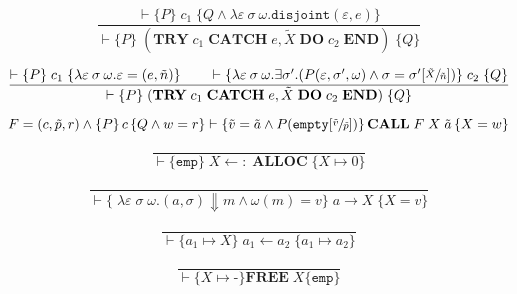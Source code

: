\begin{equation}\label{eqn:hoare-try}
\frac{\vdash \{P\} \; c_1 \; \{Q \wedge \lambda \varepsilon\:\sigma\:\omega. \texttt{disjoint}(\varepsilon, e)\}}{\vdash \{P\} \; (\textbf{TRY}\; c_1\; \textbf{CATCH}\; e, \tilde{X}\; \textbf{DO}\; c_2\; \textbf{END}) \; \{Q\}}
\end{equation}

\begin{equation}\label{eqn:hoare-catch}
\frac{\vdash \{P\} \; c_1 \; \{\lambda \varepsilon\:\sigma\:\omega. \varepsilon = (e, \tilde{n})\} \qquad \vdash \{\lambda \varepsilon\:\sigma\:\omega. \exists \sigma'. (P(\varepsilon, \sigma', \omega) \wedge \sigma = \sigma'[\sfrac{\tilde{X}}{\tilde{n}}])\} \; c_2 \; \{Q\}}{\vdash \{P\} \; (\textbf{TRY}\; c_1\; \textbf{CATCH}\; e, \tilde{X}\; \textbf{DO}\; c_2\; \textbf{END}) \; \{Q\}}
\end{equation}

\begin{equation}\label{eqn:hoare-call}
F = (c,\tilde{p},r) \wedge \left\{P\right\} c \left\{Q \wedge w = r\right\} \vdash \left\{\tilde{v} = \tilde{a} \wedge P(\texttt{empty}[\sfrac{\tilde{v}}{\tilde{p}}])\right\}\textbf{CALL} \; F \; X \; \tilde{a} \left\{X = w\right\}
\end{equation}

\begin{equation}\label{eqn:hoare-alloc}
\frac{}{\vdash \{ \texttt{emp} \}\; X\leftarrow:\;\textbf{ALLOC}\; \{X \mapsto 0\}}
\end{equation}

\begin{equation}\label{eqn:hoare-read}
\frac{}{\vdash \{\; \lambda\varepsilon\;\sigma\;\omega.(a,\sigma)\Downarrow m \wedge \omega(m) = v\}\; a \rightarrow X \;\{ X = v \}}
\end{equation}

\begin{equation}\label{eqn:hoare-write}
\frac{}{\vdash \{ a_1 \mapsto X \}\; a_1 \leftarrow a_2 \;\{ a_1 \mapsto a_2 \}}
\end{equation}

\begin{equation}\label{eqn:hoare-free}
\frac{}{\vdash \{X \mapsto \textbf{-}\}\textbf{FREE}\;X \{\texttt{emp} \}}
\end{equation}
